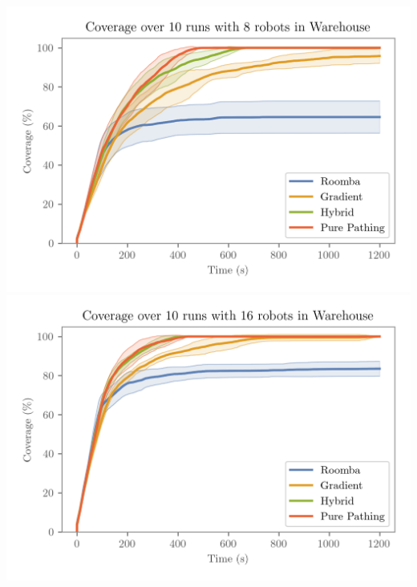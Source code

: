 \includegraphics[width=\w]{figures/plots/benchmarks/coverage-over-10-runs-with-8-robots-in-warehouse.png}
\\
\includegraphics[width=\w]{figures/plots/benchmarks/coverage-over-10-runs-with-16-robots-in-warehouse.png}

